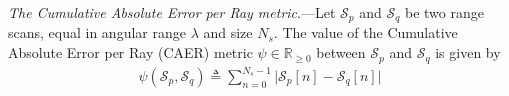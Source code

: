 \begin{definition}
  \label{def:definition_3} \textit{The Cumulative Absolute Error per Ray metric}.---Let
  $\mathcal{S}_p$ and $\mathcal{S}_q$ be two range scans, equal in angular
  range $\lambda$ and size $N_s$. The value of the Cumulative Absolute Error
  per Ray (CAER) metric $\psi \in \mathbb{R}_{\geq 0}$ between $\mathcal{S}_p$
  and $\mathcal{S}_q$ is given by
  \begin{align}
    \psi(\mathcal{S}_p,\mathcal{S}_q) \triangleq \sum\limits_{n=0}^{N_s-1} \Big| \mathcal{S}_p[n]-\mathcal{S}_q[n]\Big| \label{eq:caer}
  \end{align}
\end{definition}



